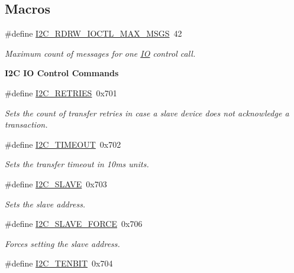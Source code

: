 \subsection*{Macros}
\begin{DoxyCompactItemize}
\item 
\#define \mbox{\hyperlink{group__I2CLinux_ga272399a0175400a2ebb55ff518a85012}{I2\+C\+\_\+\+R\+D\+R\+W\+\_\+\+I\+O\+C\+T\+L\+\_\+\+M\+A\+X\+\_\+\+M\+S\+GS}}~42
\begin{DoxyCompactList}\small\item\em Maximum count of messages for one \mbox{\hyperlink{structIO}{IO}} control call. \end{DoxyCompactList}\end{DoxyCompactItemize}
\begin{Indent}\textbf{ I2C IO Control Commands}\par
\begin{DoxyCompactItemize}
\item 
\#define \mbox{\hyperlink{group__I2CLinux_gae8b7ab32459314e0c0162974f2ce22e1}{I2\+C\+\_\+\+R\+E\+T\+R\+I\+ES}}~0x701
\begin{DoxyCompactList}\small\item\em Sets the count of transfer retries in case a slave device does not acknowledge a transaction. \end{DoxyCompactList}\item 
\#define \mbox{\hyperlink{group__I2CLinux_gafa3215f0aa766367f5d34bee80929152}{I2\+C\+\_\+\+T\+I\+M\+E\+O\+UT}}~0x702
\begin{DoxyCompactList}\small\item\em Sets the transfer timeout in 10ms units. \end{DoxyCompactList}\item 
\#define \mbox{\hyperlink{group__I2CLinux_gab15137f7c592d05573de99f078516157}{I2\+C\+\_\+\+S\+L\+A\+VE}}~0x703
\begin{DoxyCompactList}\small\item\em Sets the slave address. \end{DoxyCompactList}\item 
\#define \mbox{\hyperlink{group__I2CLinux_gafb1764d4b58fb542306c715ad6a28a42}{I2\+C\+\_\+\+S\+L\+A\+V\+E\+\_\+\+F\+O\+R\+CE}}~0x706
\begin{DoxyCompactList}\small\item\em Forces setting the slave address. \end{DoxyCompactList}\item 
\#define \mbox{\hyperlink{group__I2CLinux_ga2a0b1f3843e98977be7476579c851305}{I2\+C\+\_\+\+T\+E\+N\+B\+IT}}~0x704

\end{DoxyCompactItemize}
\end{Indent}

